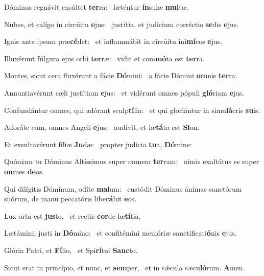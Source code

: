 \item Dóminus regnávit exsúltet \textbf{ter}ra:~\psstar{} læténtur \textbf{ín}sulæ \textbf{mul}tæ.

\item Nubes, et calígo in circúitu \textbf{e}jus:~\psstar{} justítia, et judícium corréctio \textbf{se}dis \textbf{e}jus.

\item Ignis ante ipsum præ\textbf{cé}det:~\psstar{} et inflammábit in circúitu ini\textbf{mí}cos \textbf{e}jus.

\item Illuxérunt fúlgura ejus orbi \textbf{ter}ræ:~\psstar{} vidit et com\textbf{mó}ta est \textbf{ter}ra.

\item Montes, sicut cera fluxérunt a fácie \textbf{Dó}mini:~\psstar{} a fácie Dómini \textbf{om}nis \textbf{ter}ra.

\item Annuntiavérunt cæli justítiam \textbf{e}jus:~\psstar{} et vidérunt omnes pópuli \textbf{gló}riam \textbf{e}jus.

\item Confundántur omnes, qui adórant sculp\textbf{tí}lia:~\psstar{} et qui gloriántur in simu\textbf{lá}cris \textbf{su}is.

\item Adoráte eum, omnes Angeli \textbf{e}jus:~\psstar{} audívit, et læ\textbf{tá}ta est \textbf{Si}on.

\item Et exsultavérunt fíliæ \textbf{Ju}dæ:~\psstar{} propter judícia \textbf{tu}a, \textbf{Dó}mine:

\item Quóniam tu Dóminus Altíssimus super omnem \textbf{ter}ram:~\psstar{} nimis exaltátus es super \textbf{om}nes \textbf{de}os.

\item Qui dilígitis Dóminum, odíte \textbf{ma}lum:~\psstar{} custódit Dóminus ánimas sanctórum suórum, de manu peccatóris libe\textbf{rá}bit \textbf{e}os.

\item Lux orta est \textbf{jus}to,~\psstar{} et rectis \textbf{cor}de læ\textbf{tí}tia.

\item Lætámini, justi in \textbf{Dó}mino:~\psstar{} et confitémini memóriæ sanctificati\textbf{ó}nis \textbf{e}jus.

\item Glória Patri, et \textbf{Fí}lio,~\psstar{} et Spi\textbf{rí}tui \textbf{Sanc}to.

\item Sicut erat in princípio, et nunc, et \textbf{sem}per,~\psstar{} et in sǽcula sæcu\textbf{ló}rum. \textbf{A}men.
